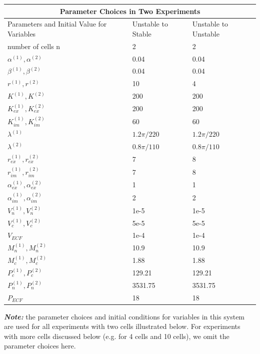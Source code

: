 \documentclass[12pt]{article}
\renewcommand{\(}{\left (}
\renewcommand{\)}{\right )}
\begin{document}
\begin{center}
\begin{tabular}{ |p{4cm}||p{3.5cm}|p{3.5cm}|  }
 \hline
 \multicolumn{3}{|c|}{Parameter Choices in Two Experiments} \\
 \hline
 Parameters and Initial Value for Variables& Unstable to Stable& Unstable to Unstable\\
 \hline
 number of cells n& 2 & 2\\
 $\alpha^{(1)}, \alpha^{(2)}$& 0.04 & 0.04\\
 $\beta^{(1)}, \beta^{(2)}$& 0.04 & 0.04\\
 $r^{(1)}, r^{(2)}$& 10 & 4\\
 $K^{(1)}, K^{(2)}$& 200 & 200\\
 $K_{ex}^{(1)}, K_{ex}^{(2)}$& 200 & 200\\
 $K_{im}^{(1)}, K_{im}^{(2)}$& 60 & 60\\
 $\lambda^{(1)}$& ${1.2\pi}/{220}$ & ${1.2\pi}/{220}$\\
 $\lambda^{(2)}$& ${0.8\pi}/{110}$ & ${0.8\pi}/{110}$\\
 $r_{ex}^{(1)}, r_{ex}^{(2)}$& 7 & 8\\
 $r_{im}^{(1)}, r_{im}^{(2)}$& 7 & 8\\
 $\alpha_{ex}^{(1)}, \alpha_{ex}^{(2)}$& 1 & 1\\
 $\alpha_{im}^{(1)}, \alpha_{im}^{(2)}$& 2 & 2\\
 $V_n^{(1)}, V_n^{(2)}$& 1e-5 & 1e-5\\
 $V_c^{(1)}, V_c^{(2)}$& 5e-5 & 5e-5\\
 $V_{ECF}$& 1e-4 & 1e-4\\
 $M_n^{(1)}, M_n^{(2)}$& 10.9 & 10.9\\
 $M_c^{(1)}, M_c^{(2)}$& 1.88 & 1.88\\
 $P_c^{(1)}, P_c^{(2)}$& 129.21 & 129.21\\
 $P_n^{(1)}, P_n^{(2)}$& 3531.75 & 3531.75\\
 $P_{ECF}$& 18 & 18\\
 \hline
\end{tabular}
\end{center}

\vspace{5mm}

\textbf{\textit{Note:}} the parameter choices and initial conditions for variables in this system are used for all experiments with two cells illustrated below. For experiments with more cells discussed below (e.g. for 4 cells and 10 cells), we omit the parameter choices here.
\end{document}
